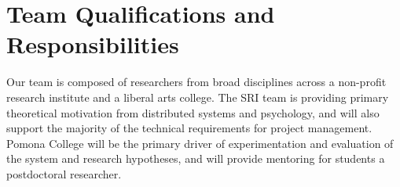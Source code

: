 
\section*{Team Qualifications and Responsibilities} %
\label{sec:teamQuals}

Our team is composed of researchers from broad disciplines across a non-profit research
institute and a liberal arts college. The SRI team is providing primary theoretical
motivation from distributed systems and psychology, and will also support the majority of
the technical requirements for project management. Pomona College will be the primary
driver of experimentation and evaluation of the system and research hypotheses, and will
provide mentoring for students a postdoctoral researcher.
